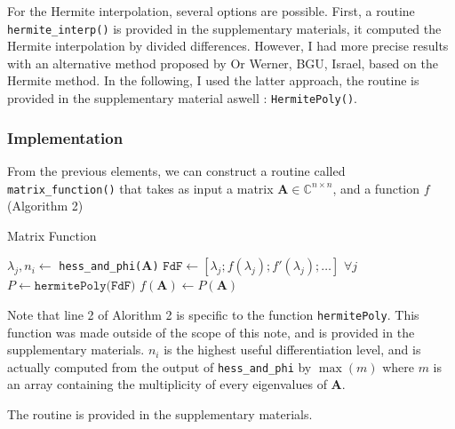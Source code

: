 \documentclass[11pt]{article}
\numberwithin{equation}{section}
\begin{document}
For the Hermite interpolation, several options are possible. First, a routine \texttt{hermite\_interp()} is provided in the supplementary materials, it computed the Hermite interpolation by divided differences. However, I had more precise results with an alternative method proposed by Or Werner, BGU, Israel, based on the Hermite method. In the following, I used the latter approach, the routine is provided in the supplementary material aswell : \texttt{HermitePoly()}.
\subsubsection{Implementation}
From the previous elements, we can construct a routine called \texttt{matrix\_function()} that takes as input a matrix $\mathbf{A}\in\mathbb{C}^{n\times n}$, and a function $f$ (Algorithm 2)

\begin{algorithm2e}
    \SetAlgoLined
    \caption{Matrix Function}
    $\lambda_j, n_i \gets$ \texttt{hess\_and\_phi($\mathbf{A}$)}\;
    $\texttt{FdF} \gets [\lambda_j;f(\lambda_j);f'(\lambda_j);\dots]$ $\forall j$\;
    $P \gets \texttt{hermitePoly(FdF)}$\;
    $f(\mathbf{A}) \gets P(\mathbf{A})$

\end{algorithm2e}

Note that line 2 of Alorithm 2 is specific to the function \texttt{hermitePoly}. This function was made outside of the scope of this note, and is provided in the supplementary materials. $n_i$ is the highest useful differentiation level, and is actually computed from the output of \texttt{hess\_and\_phi} by $\max(m)$ where $m$ is an array containing the multiplicity of every eigenvalues of $\mathbf{A}$.

The routine is provided in the supplementary materials.
\end{document}
